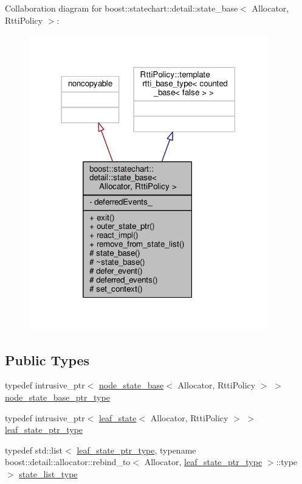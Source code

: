 Collaboration diagram for boost\+:\+:statechart\+:\+:detail\+:\+:state\+\_\+base$<$ Allocator, Rtti\+Policy $>$\+:
\nopagebreak
\begin{figure}[H]
\begin{center}
\leavevmode
\includegraphics[width=294pt]{classboost_1_1statechart_1_1detail_1_1state__base__coll__graph}
\end{center}
\end{figure}
\subsection*{Public Types}
\begin{DoxyCompactItemize}
\item 
typedef intrusive\+\_\+ptr$<$ \mbox{\hyperlink{classboost_1_1statechart_1_1detail_1_1node__state__base}{node\+\_\+state\+\_\+base}}$<$ Allocator, Rtti\+Policy $>$ $>$ \mbox{\hyperlink{classboost_1_1statechart_1_1detail_1_1state__base_a8e3dd0f80bf95d7df21417a50f1dbaa1}{node\+\_\+state\+\_\+base\+\_\+ptr\+\_\+type}}
\item 
typedef intrusive\+\_\+ptr$<$ \mbox{\hyperlink{classboost_1_1statechart_1_1detail_1_1leaf__state}{leaf\+\_\+state}}$<$ Allocator, Rtti\+Policy $>$ $>$ \mbox{\hyperlink{classboost_1_1statechart_1_1detail_1_1state__base_a80b7d62ba0bb8e4fbef3e2e76e2a6021}{leaf\+\_\+state\+\_\+ptr\+\_\+type}}
\item 
typedef std\+::list$<$ \mbox{\hyperlink{classboost_1_1statechart_1_1detail_1_1state__base_a80b7d62ba0bb8e4fbef3e2e76e2a6021}{leaf\+\_\+state\+\_\+ptr\+\_\+type}}, typename boost\+::detail\+::allocator\+::rebind\+\_\+to$<$ Allocator, \mbox{\hyperlink{classboost_1_1statechart_1_1detail_1_1state__base_a80b7d62ba0bb8e4fbef3e2e76e2a6021}{leaf\+\_\+state\+\_\+ptr\+\_\+type}} $>$\+::type $>$ \mbox{\hyperlink{classboost_1_1statechart_1_1detail_1_1state__base_a30bb6c4893e4cd84e80133feb2cc8230}{state\+\_\+list\+\_\+type}}
\end{DoxyCompactItemize}
